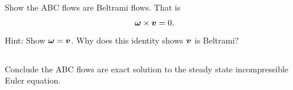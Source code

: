 \documentclass[11pt,letterpaper]{article}
\begin{document}
\subsection{}
Show the ABC flows are Beltrami flows. That is
\begin{align}
    \boldsymbol{\omega}\times\boldsymbol{v} = 0.
\end{align}
Hint: Show $\boldsymbol{\omega} = \boldsymbol{v}$. Why does this identity shows $\boldsymbol{v}$ is Beltrami?

\subsection{}
Conclude the ABC flows are exact solution to the steady state incompressible Euler equation.

    
\vfill
\printbibliography
\end{document}
